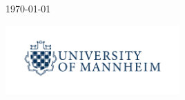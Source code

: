 \begin{titlepage}
	
	
	\vfill\vfill\vfill %
	
	{\large\today} %
	
	
	\vfill\vfill
	\includegraphics[width=0.5\textwidth]{img/logo-universitaet-mannheim.jpg}\\[1cm] 
	 
	
	\vfill %
	
\end{titlepage}
\hypersetup{pageanchor=true}